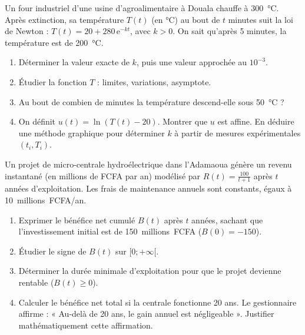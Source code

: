 \documentclass[11pt]{article}
\begin{document}
\begin{exercice}
Un four industriel d'une usine d'agroalimentaire à Douala chauffe à \SI{300}{\celsius}. Après extinction, sa température $T(t)$ (en \si{\celsius}) au bout de $t$ minutes suit la loi de Newton : $T(t) = 20 + 280\,\mathrm{e}^{-kt}$, avec $k>0$. On sait qu'après 5 minutes, la température est de \SI{200}{\celsius}.
\begin{enumerate}
    \item Déterminer la valeur exacte de $k$, puis une valeur approchée au $10^{-3}$.
    \item Étudier la fonction $T$ : limites, variations, asymptote. 
    \item Au bout de combien de minutes la température descend-elle sous \SI{50}{\celsius} ? 
    \item On définit $u(t) = \ln(T(t)-20)$. Montrer que $u$ est affine. En déduire une méthode graphique pour déterminer $k$ à partir de mesures expérimentales $(t_i, T_i)$.
\end{enumerate}
\end{exercice}

\begin{exercice}
Un projet de micro-centrale hydroélectrique dans l'Adamaoua génère un revenu instantané (en millions de FCFA par an) modélisé par $R(t) = \frac{100}{t+1}$ après $t$ années d'exploitation. Les frais de maintenance annuels sont constants, égaux à \SI{10}{millions.FCFA/an}.
\begin{enumerate}
    \item Exprimer le bénéfice net cumulé $B(t)$ après $t$ années, sachant que l'investissement initial est de \SI{150}{millions.FCFA} ($B(0) = -150$).
    \item Étudier le signe de $B(t)$ sur $[0; +\infty[$. 
    \item Déterminer la durée minimale d'exploitation pour que le projet devienne rentable ($B(t) \ge 0$). 
    \item Calculer le bénéfice net total si la centrale fonctionne 20 ans. Le gestionnaire affirme : « Au-delà de 20 ans, le gain annuel est négligeable ». Justifier mathématiquement cette affirmation.
\end{enumerate}
\end{exercice}
\end{document}
